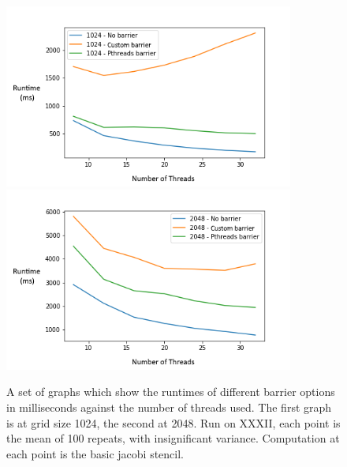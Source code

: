 \begin{figure}[H]
    \begin{center}
        \includegraphics[width=0.85\textwidth]{graphics/performance_characteristics/barrier-1024.png}
        \includegraphics[width=0.85\textwidth]{graphics/performance_characteristics/barrier-2048.png}
    \end{center}
    \caption{A set of graphs which show the runtimes of different barrier options in milliseconds against the number of threads used. The first graph is at grid size 1024, the second at 2048. Run on XXXII, each point is the mean of 100 repeats, with insignificant variance. Computation at each point is the basic jacobi stencil.}
    \label{fig:barrier_sync}
\end{figure}



